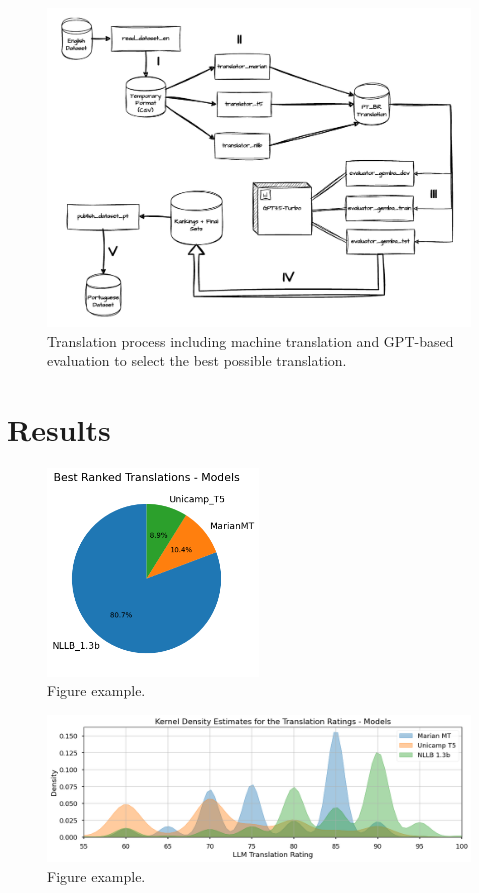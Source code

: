 \documentclass{article}
\begin{document}
\begin{figure}[htbp]
    \centering
    \includegraphics[width=1\textwidth]{drawio/translation.drawio.pdf}
    \caption{\label{fig:diagram}Translation process including machine
    translation and GPT-based evaluation to select the best possible
    translation.}
\end{figure}

\section{Results}

\begin{figure}[htbp]
    \centering
    \includegraphics[width=0.5\textwidth]{figures/pie-chart.png}
    \caption{\label{fig:pie}Figure example.}
\end{figure}

\begin{figure}[htbp]
    \centering
    \includegraphics[width=1\textwidth]{figures/kde.png}
    \caption{\label{fig:kde}Figure example.}
\end{figure}
\end{document}
